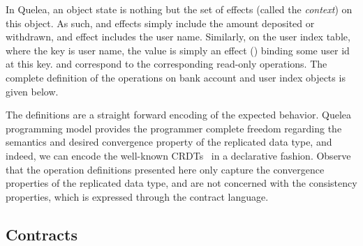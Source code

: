 In Quelea, an object state is nothing but the set of effects (called
the \emph{context}) on this object. As such,  and
 effects simply include the amount deposited or
withdrawn, and  effect includes the user name. Similarly,
on the user index table, where the key is user name, the value is
simply an effect () binding some user id at this key.
 and  correspond to the corresponding
read-only operations. The complete definition of the operations on
bank account and user index objects is given below.


The definitions are a straight forward encoding of the expected behavior.
Quelea programming model provides the programmer complete freedom regarding the
semantics and desired convergence property of the replicated data type, and
indeed, we can encode the well-known CRDTs~\cite{SSS} in a declarative fashion.
Observe that the operation definitions presented here only capture the
convergence properties of the replicated data type, and are not concerned with
the consistency properties, which is expressed through the contract language.

\subsection{Contracts}


